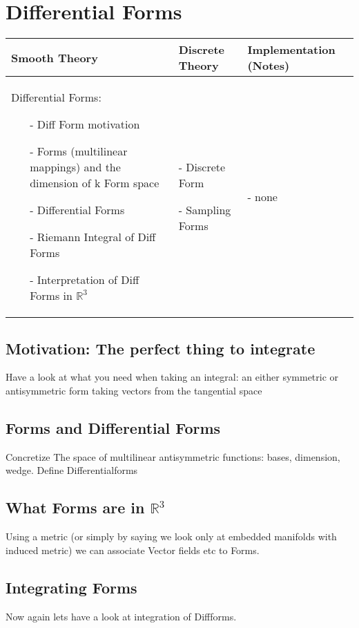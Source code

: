 \documentclass{scrartcl}
\newenvironment{packed_enum}{
\begin{enumerate}
  \setlength{\itemsep}{1pt}
  \setlength{\parskip}{0pt}
  \setlength{\parsep}{0pt}
}{\end{enumerate}}
\begin{document}
\section{Differential Forms}
	\begin{longtable}{|p{4.5cm}|p{4.5cm}|p{4.5cm}|}
		\hline
		Smooth Theory& Discrete Theory& Implementation (Notes)\\
		\hline
			Differential Forms: \begin{itemize}
			  \setlength{\itemsep}{1pt}
			  \setlength{\parskip}{0pt}
				\setlength{\parsep}{0pt}
				\item[-]Diff Form motivation
				\item[-]Forms (multilinear mappings) and the dimension of k Form space 
				\item[-]Differential Forms 
				\item[-]Riemann Integral of Diff Forms 
				\item[-]Interpretation of Diff Forms in $\mathbb R^3$ 
			\end{itemize}
			&
			\begin{packed_enum}
				\item[-] Discrete Form
				\item[-] Sampling Forms
			\end{packed_enum}
			 & - none
			 \\		
		\hline
	\end{longtable}
	\subsection{Motivation: The perfect thing to integrate}
		Have a look at what you need when taking an integral: an either symmetric or antisymmetric form taking
		vectors from the tangential space
	\subsection{Forms and Differential Forms}
		Concretize The space of multilinear antisymmetric functions: bases, dimension, wedge. Define Differentialforms
	\subsection{What Forms are in $\mathbb{R}^3$}
		Using a metric (or simply by saying we look only at embedded manifolds with induced metric) we can associate
		Vector fields etc to Forms.
	\subsection{Integrating Forms}
		Now again lets have a look at integration of Diffforms.
\end{document}
